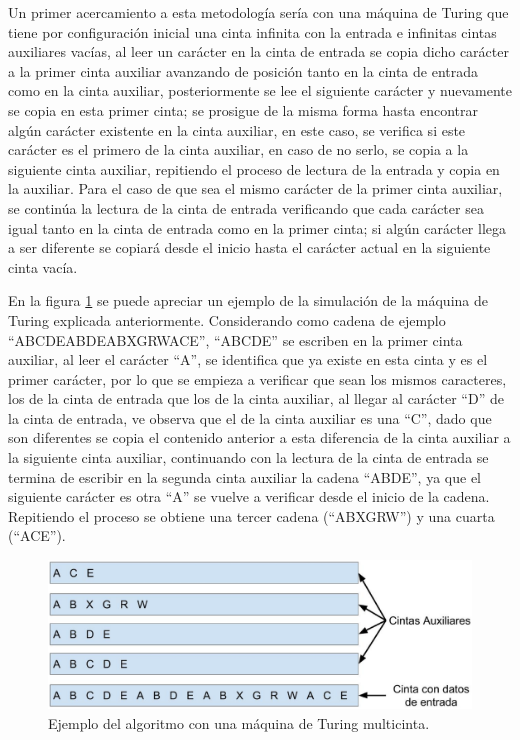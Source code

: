 Un primer acercamiento a esta metodolog\'ia ser\'ia con una m\'aquina de 
 Turing que tiene por configuraci\'on inicial una cinta infinita
 con la entrada e infinitas cintas auxiliares vac\'ias, al leer
 un car\'acter en la cinta de entrada se copia dicho car\'acter a la primer 
 cinta auxiliar avanzando de posici\'on tanto en la cinta de entrada como 
 en la cinta auxiliar, posteriormente se lee el siguiente car\'acter y 
 nuevamente se copia en esta primer cinta; se prosigue de la misma forma 
 hasta encontrar alg\'un car\'acter existente en la cinta auxiliar, en 
 este caso, se verifica si este car\'acter es el primero de la cinta
 auxiliar, en caso de no serlo, se copia a la siguiente cinta auxiliar, 
 repitiendo el proceso de lectura de la entrada y copia en la auxiliar. 
 Para el caso de que sea el mismo car\'acter de la primer cinta auxiliar, 
 se contin\'ua la lectura de la cinta de entrada verificando que cada car\'acter 
 sea igual tanto en la cinta de entrada como en la primer cinta; si alg\'un 
 car\'acter llega a ser diferente se copiar\'a desde el inicio hasta el 
 car\'acter actual en la siguiente cinta vac\'ia.

  
En la figura \ref{fig:alg01} se puede apreciar un ejemplo de la simulaci\'on de 
 la m\'aquina de Turing explicada anteriormente. Considerando como cadena de 
 ejemplo ``ABCDEABDEABXGRWACE'', ``ABCDE'' se escriben en la primer cinta 
 auxiliar, al leer el car\'acter ``A'', se identifica que ya existe en esta 
 cinta y es el primer car\'acter, por lo que se empieza a verificar que sean
 los mismos caracteres, los de la cinta de entrada que los de la cinta 
 auxiliar, al llegar al car\'acter ``D'' de la cinta de entrada, ve observa 
 que el de la cinta auxiliar es una ``C'', dado que son diferentes se copia 
 el contenido anterior a esta diferencia de la cinta auxiliar a la siguiente 
 cinta auxiliar, continuando con la lectura de la cinta de entrada se termina 
 de escribir en la segunda cinta auxiliar la cadena ``ABDE'', ya que el 
 siguiente car\'acter es otra ``A'' se vuelve a verificar desde el inicio de 
 la cadena. Repitiendo el proceso se obtiene una tercer cadena (``ABXGRW'') 
 y una cuarta (``ACE'').
  
\begin{figure}[h]
\centering
\includegraphics[width=1.0\columnwidth]{chap4/Imagenes/algoritmo1.eps}
\caption{Ejemplo del algoritmo con una m\'aquina de Turing multicinta.}
\label{fig:alg01}
\end{figure}
 